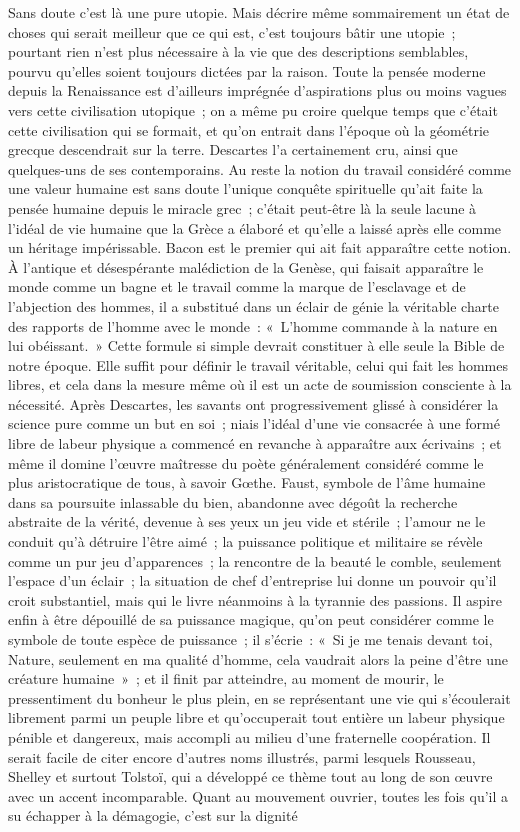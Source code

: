 \documentclass[french,twoside]{book} %
\begin{document}
Sans doute c'est là une pure utopie. Mais décrire même sommairement un état de choses qui serait meilleur que ce qui est, c'est toujours bâtir une utopie ; pourtant rien n'est plus nécessaire à la vie que des descriptions semblables, pourvu qu'elles soient toujours dictées par la raison. Toute la pensée moderne depuis la Renaissance est d'ailleurs imprégnée d'aspirations plus ou moins vagues vers cette civilisation utopique ; on a même pu croire quelque temps que c'était cette civilisation qui se formait, et qu'on entrait dans l'époque où la géométrie grecque descendrait sur la terre. Descartes l'a certainement cru, ainsi que quelques-uns de ses contemporains. Au reste la notion du travail considéré comme une valeur humaine est sans doute l'unique conquête spirituelle qu'ait faite la pensée humaine depuis le miracle grec ; c'était peut-être là la seule lacune à l'idéal de vie humaine que la Grèce a élaboré et qu'elle a laissé après elle comme un héritage impérissable. Bacon est le premier qui ait fait apparaître cette notion. À l'antique et désespérante malédiction de la Genèse, qui faisait apparaître le monde comme un bagne et le travail comme la marque de l'esclavage et de l'abjection des hommes, il a substitué dans un éclair de génie la véritable charte des rapports de l'homme avec le monde : « L'homme commande à la nature en lui obéissant. » Cette formule si simple devrait constituer à elle seule la Bible de notre époque. Elle suffit pour définir le travail véritable, celui qui fait les hommes libres, et cela dans la mesure même où il est un acte de soumission consciente à la nécessité. Après Descartes, les savants ont progressivement glissé à considérer la science pure comme un but en soi ; niais l'idéal d'une vie consacrée à une formé libre de labeur physique a commencé en revanche à apparaître aux écrivains ; et même il domine l'œuvre maîtresse du poète généralement considéré comme le plus aristocratique de tous, à savoir Gœthe. Faust, symbole de l'âme humaine dans sa poursuite inlassable du bien, abandonne avec dégoût la recherche abstraite de la vérité, devenue à ses yeux un jeu vide et stérile ; l'amour ne le conduit qu'à détruire l'être aimé ; la puissance politique et militaire se révèle comme un pur jeu d'apparences ; la rencontre de la beauté le comble, seulement l'espace d'un éclair ; la situation de chef d'entreprise lui donne un pouvoir qu'il croit substantiel, mais qui le livre néanmoins à la tyrannie des passions. Il aspire enfin à être dépouillé de sa puissance magique, qu'on peut considérer comme le symbole de toute espèce de puissance ; il s'écrie : « Si je me tenais devant toi, Nature, seulement en ma qualité d'homme, cela vaudrait alors la peine d'être une créature humaine » ; et il finit par atteindre, au moment de mourir, le pressentiment du bonheur le plus plein, en se représentant une vie qui s'écoulerait librement parmi un peuple libre et qu'occuperait tout entière un labeur physique pénible et dangereux, mais accompli au milieu d'une fraternelle coopération. Il serait facile de citer encore d'autres noms illustrés, parmi lesquels Rousseau, Shelley et surtout Tolstoï, qui a développé ce thème tout au long de son œuvre avec un accent incomparable. Quant au mouvement ouvrier, toutes les fois qu'il a su échapper à la démagogie, c'est sur la dignité 
\end{document}
